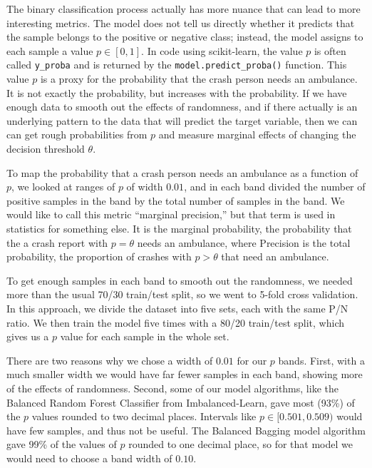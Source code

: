 The binary classification process actually has more nuance that can lead to more interesting metrics.  The model does not tell us directly whether it predicts that the sample belongs to the positive or negative class; instead, the model assigns to each sample a value $p \in [0,1]$.  In code using scikit-learn, the value $p$ is often called \verb|y_proba| and is returned by the \verb|model.predict_proba()| function.  This value $p$ is a proxy for the probability that the crash person needs an ambulance.  It is not exactly the probability, but increases with the probability.  If we have enough data to smooth out the effects of randomness, and if there actually is an underlying pattern to the data that will predict the target variable, then we can can get rough probabilities from $p$ and measure marginal effects of changing the decision threshold $\theta$.

To map the probability that a crash person needs an ambulance as a function of $p$, we looked at ranges of $p$ of width $0.01$, and in each band divided the number of positive samples in the band by the total number of samples in the band.  We would like to call this metric ``marginal precision,'' but that term is used in statistics for something else.  It is the marginal probability, the probability that the a crash report with $p = \theta$ needs an ambulance, where Precision is the total probability, the proportion of crashes with $p > \theta$ that need an ambulance.  

To get enough samples in each band to smooth out the randomness, we needed more than the usual 70/30 train/test split, so we went to 5-fold cross validation.  In this approach, we divide the dataset into five sets, each with the same P/N ratio.  We then train the model five times with a 80/20 train/test split, which gives us a $p$ value for each sample in the whole set.  

There are two reasons why we chose a width of $0.01$ for our $p$ bands.  First, with a much smaller width we would have far fewer samples in each band, showing more of the effects of randomness.  Second, some of our model algorithms, like the Balanced Random Forest Classifier from Imbalanced-Learn, gave most (93\%) of the $p$ values rounded to two decimal places.  Intervals like $p \in [0.501,0.509)$ would have few samples, and thus not be useful.  The Balanced Bagging model algorithm gave 99\% of the values of $p$ rounded to one decimal place, so for that model we would need to choose a band width of $0.10.$

